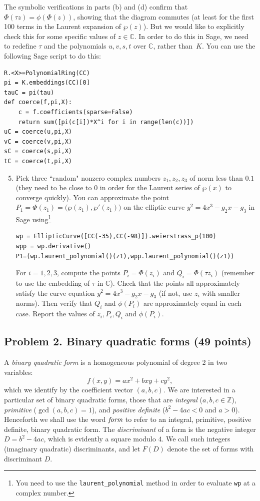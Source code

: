 \documentclass[11pt]{article}
\newcommand{\C}{\mathbb{C}}
\newcommand{\Z}{\mathbb{Z}}
\theoremstyle{definition}
\begin{document}
The symbolic verifications in parts (b) and (d) confirm that $\Phi(\tau z) =\phi(\Phi(z))$, showing that the diagram commutes (at least for the first 100 terms in the Laurent expansion of $\wp(z)$).
But we would like to explicitly check this for some specific values of $z\in \C$.
In order to do this in Sage, we need to redefine $\tau$ and the polynomials $u,v,s,t$ over $\C$, rather than~$K$.
You can use the following Sage script to do this:
\begin{lstlisting}
R.<X>=PolynomialRing(CC)
pi = K.embeddings(CC)[0]
tauC = pi(tau)
def coerce(f,pi,X):
    c = f.coefficients(sparse=False)
    return sum([pi(c[i])*X^i for i in range(len(c))])
uC = coerce(u,pi,X)
vC = coerce(v,pi,X)
sC = coerce(s,pi,X)
tC = coerce(t,pi,X)
\end{lstlisting}

\begin{enumerate}[{\bf(a)}]
\setcounter{enumi}{4}
\item Pick three ``random" nonzero complex numbers $z_1,z_2,z_3$ of norm less than $0.1$ (they need to be close to $0$ in order for the Laurent series of $\wp(x)$ to converge quickly).
You can approximate the point $P_1=\Phi(z_1)=\bigl(\wp(z_1),\wp'(z_1)\bigr)$ on the elliptic curve $y^2=4x^3-g_2x-g_3$ in Sage using\footnote{You need to use the \texttt{laurent\_polynomial} method in order to evaluate \texttt{wp} at a complex number.}

\begin{lstlisting}
wp = EllipticCurve([CC(-35),CC(-98)]).weierstrass_p(100)
wpp = wp.derivative()
P1=(wp.laurent_polynomial()(z1),wpp.laurent_polynomial()(z1))
\end{lstlisting}
For $i=1,2,3$, compute  the points $P_i=\Phi(z_i)$ and $Q_i=\Phi(\tau z_i)$ (remember to use the embedding of $\tau$ in $\C$).
Check that the points all approximately satisfy the curve equation $y^2=4x^3-g_2x-g_3$ (if not, use $z_i$ with smaller norms).
Then verify that $Q_i$ and $\phi(P_i)$ are approximately equal in each case.
Report the values of $z_i,P_i,Q_i$ and $\phi(P_i)$.
\end{enumerate}


\subsection*{Problem 2. Binary quadratic forms (49 points)}

A \emph{binary quadratic form} is a homogeneous polynomial of degree 2 in two variables:
\[
f(x,y)=ax^2+bxy+cy^2,
\]
which we identify by the coefficient vector $(a,b,c)$.
We are interested in a particular set of binary quadratic forms, those that are
\emph{integral} ($a,b,c\in\Z$), \emph{primitive} ($\gcd(a,b,c)=1$), and \emph{positive definite} ($b^2-4ac<0$ and $a>0$).
Henceforth we shall use the word $\emph{form}$ to refer to an integral, primitive, positive definite, binary quadratic form.
The \emph{discriminant} of a form is the negative integer $D=b^2-4ac$, which is evidently a square modulo $4$.
We call such integers (imaginary quadratic) discriminants, and let $F(D)$ denote the set of forms with discriminant $D$.
\end{document}
